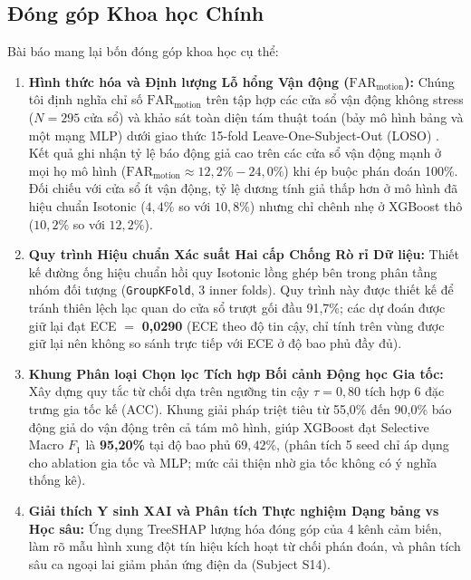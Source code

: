 \documentclass[conference]{IEEEtran}
\begin{document}
\subsection{Đóng góp Khoa học Chính}
Bài báo mang lại bốn đóng góp khoa học cụ thể:
\begin{enumerate}
    \item \textbf{Hình thức hóa và Định lượng Lỗ hổng Vận động ($\text{FAR}_{\text{motion}}$):} Chúng tôi định nghĩa chỉ số $\text{FAR}_{\text{motion}}$ trên tập hợp các cửa sổ vận động không stress ($N=295$ cửa sổ) và khảo sát toàn diện tám thuật toán (bảy mô hình bảng và một mạng MLP) dưới giao thức 15-fold Leave-One-Subject-Out (LOSO) \cite{saeb2017need, little2017using}. Kết quả ghi nhận tỷ lệ báo động giả cao trên các cửa sổ vận động mạnh ở mọi họ mô hình ($\text{FAR}_{\text{motion}} \approx 12,2\% - 24,0\%$) khi ép buộc phán đoán 100\%. Đối chiếu với cửa sổ ít vận động, tỷ lệ dương tính giả thấp hơn ở mô hình đã hiệu chuẩn Isotonic ($4,4\%$ so với $10,8\%$) nhưng chỉ chênh nhẹ ở XGBoost thô ($10,2\%$ so với $12,2\%$).
    \item \textbf{Quy trình Hiệu chuẩn Xác suất Hai cấp Chống Rò rỉ Dữ liệu:} Thiết kế đường ống hiệu chuẩn hồi quy Isotonic lồng ghép bên trong phân tầng nhóm đối tượng (\texttt{GroupKFold}, 3 inner folds). Quy trình này được thiết kế để tránh thiên lệch lạc quan do cửa sổ trượt gối đầu 91,7\%; các dự đoán được giữ lại đạt ECE $=$ \textbf{0,0290} (ECE theo độ tin cậy, chỉ tính trên vùng được giữ lại nên không so sánh trực tiếp với ECE ở độ bao phủ đầy đủ).
    \item \textbf{Khung Phân loại Chọn lọc Tích hợp Bối cảnh Động học Gia tốc:} Xây dựng quy tắc từ chối dựa trên ngưỡng tin cậy $\tau = 0,80$ tích hợp 6 đặc trưng gia tốc kế (ACC). Khung giải pháp triệt tiêu từ 55,0\% đến 90,0\% báo động giả do vận động trên cả tám mô hình, giúp XGBoost đạt Selective Macro $F_1$ là \textbf{95,20\%} tại độ bao phủ $69,42\%$, (phân tích 5 seed chỉ áp dụng cho ablation gia tốc và MLP; mức cải thiện nhờ gia tốc không có ý nghĩa thống kê).
    \item \textbf{Giải thích Y sinh XAI và Phân tích Thực nghiệm Dạng bảng vs Học sâu:} Ứng dụng TreeSHAP \cite{lundberg2020local} lượng hóa đóng góp của 4 kênh cảm biến, làm rõ mẫu hình xung đột tín hiệu kích hoạt từ chối phán đoán, và phân tích sâu ca ngoại lai giảm phản ứng điện da (Subject S14).
\end{enumerate}

\end{document}
